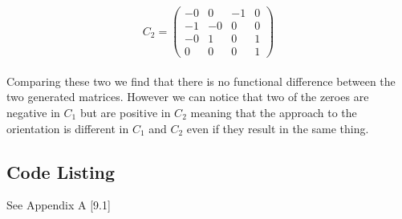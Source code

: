 		$$
		C_{2} =
		\begin{pmatrix}
			-0 & 0 & -1 & 0\\
			-1 & -0 & 0 & 0\\
			-0  & 1  & 0 & 1\\
			0 & 0 & 0 & 1
		\end{pmatrix}
		$$		
		\\
		Comparing these two we find that there is no functional difference between the two generated matrices. However we can notice that two of the zeroes are negative in $C_{1}$ but are positive in $C_{2}$ meaning that the approach to the orientation is different in $C_{1}$ and $C_{2}$ even if they result in the same thing.
		
		\subsection*{Code Listing}
			See Appendix A [9.1]